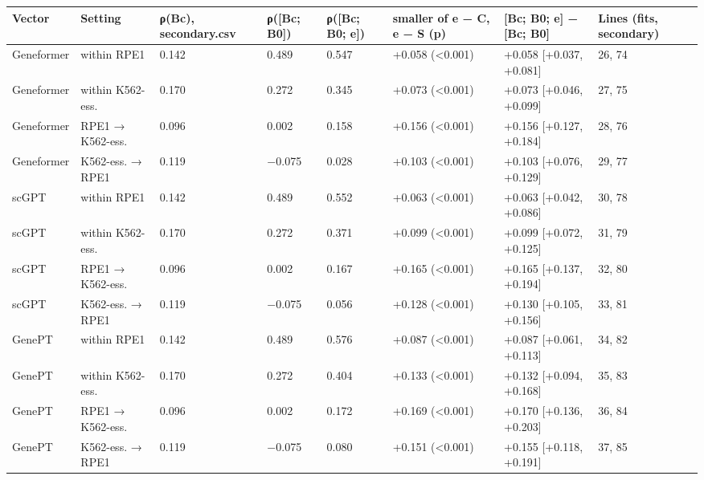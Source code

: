 \begin{tabular}{llllllll}
\toprule
Vector & Setting & ρ(Bc), secondary.csv & ρ([Bc; B0]) & ρ([Bc; B0; e]) & smaller of e − C, e − S (p) & [Bc; B0; e] − [Bc; B0] & Lines (fits, secondary) \\
\midrule
Geneformer & within RPE1 & 0.142 & 0.489 & 0.547 & +0.058 (<0.001) & +0.058 [+0.037, +0.081] & 26, 74 \\
Geneformer & within K562-ess. & 0.170 & 0.272 & 0.345 & +0.073 (<0.001) & +0.073 [+0.046, +0.099] & 27, 75 \\
Geneformer & RPE1 → K562-ess. & 0.096 & 0.002 & 0.158 & +0.156 (<0.001) & +0.156 [+0.127, +0.184] & 28, 76 \\
Geneformer & K562-ess. → RPE1 & 0.119 & −0.075 & 0.028 & +0.103 (<0.001) & +0.103 [+0.076, +0.129] & 29, 77 \\
scGPT & within RPE1 & 0.142 & 0.489 & 0.552 & +0.063 (<0.001) & +0.063 [+0.042, +0.086] & 30, 78 \\
scGPT & within K562-ess. & 0.170 & 0.272 & 0.371 & +0.099 (<0.001) & +0.099 [+0.072, +0.125] & 31, 79 \\
scGPT & RPE1 → K562-ess. & 0.096 & 0.002 & 0.167 & +0.165 (<0.001) & +0.165 [+0.137, +0.194] & 32, 80 \\
scGPT & K562-ess. → RPE1 & 0.119 & −0.075 & 0.056 & +0.128 (<0.001) & +0.130 [+0.105, +0.156] & 33, 81 \\
GenePT & within RPE1 & 0.142 & 0.489 & 0.576 & +0.087 (<0.001) & +0.087 [+0.061, +0.113] & 34, 82 \\
GenePT & within K562-ess. & 0.170 & 0.272 & 0.404 & +0.133 (<0.001) & +0.132 [+0.094, +0.168] & 35, 83 \\
GenePT & RPE1 → K562-ess. & 0.096 & 0.002 & 0.172 & +0.169 (<0.001) & +0.170 [+0.136, +0.203] & 36, 84 \\
GenePT & K562-ess. → RPE1 & 0.119 & −0.075 & 0.080 & +0.151 (<0.001) & +0.155 [+0.118, +0.191] & 37, 85 \\
\bottomrule
\end{tabular}
